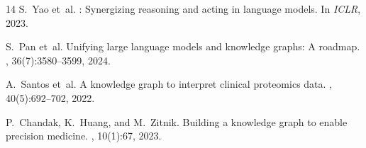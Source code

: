 \documentclass[sigconf]{acmart}
\begin{document}
\begin{thebibliography}{14}
S.~Yao et~al.
: Synergizing reasoning and acting in language models.
\newblock In {\em ICLR}, 2023.

S.~Pan et~al.
\newblock Unifying large language models and knowledge graphs: A roadmap.
, 36(7):3580--3599, 2024.

A.~Santos et~al.
\newblock A knowledge graph to interpret clinical proteomics data.
, 40(5):692--702, 2022.

P.~Chandak, K.~Huang, and M.~Zitnik.
\newblock Building a knowledge graph to enable precision medicine.
, 10(1):67, 2023.

\end{thebibliography}
\end{document}
